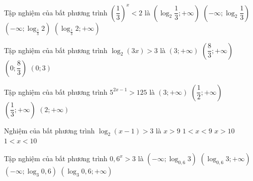 \begin{ex}%
	Tập  nghiệm của bất phương trình $\left(\dfrac{1}{3}\right)^{x} <2$ là
	\choice 
		{$\left(\log_2  \dfrac{1}{3};+\infty\right)$}
		{$\left(-\infty;\log_2 \dfrac{1}{3}\right)$} 
		{$\left(-\infty;\log_{\tfrac{1}{3}}2\right)$} 
		 {\True $\left(\log_{\tfrac{1}{3}}2;+\infty\right)$}
\end{ex}

\begin{ex}%
	Tập nghiệm của bất phương  trình $\log_2(3x) > 3$ là
	\choice 
		{$(3;+\infty)$} 
		 {\True $\left(\dfrac{8}{3};+\infty\right)$}
		{$\left(0; \dfrac{8}{3}\right)$} 
		{$(0;3)$} 
\end{ex}

\begin{ex}%
	Tập  nghiệm của bất phương trình $5^{2x-1}>125$ là
	\choice 
		 { $\left(3;+\infty\right)$}
		 {$\left(\dfrac{1}{2};+\infty\right)$}
		{$\left(\dfrac{1}{3};+\infty\right)$} 
		{\True  $\left(2;+\infty\right)$}
\end{ex}

\begin{ex}%
	Nghiệm của bất phương trình $\log_2  \left(x-1\right)>3$ là
	 \choice
		{\True $x>9$} 
		{$1<x<9$} 
		 {$x>10$}
		{$1<x<10$} 
\end{ex}

\begin{ex}%
	Tập nghiệm của bất phương trình  $0{,}6^x>3$ là
	 \choice
		 {\True $\left(-\infty;\log_{0{,}6} 3\right)$}
		{$\left(\log_{0{,}6}  3;+\infty\right)$}
		{$\left(-\infty;\log_{3} 0{,}6\right)$} 
		 {$\left(\log_{3} 0{,}6;+\infty\right)$}
\end{ex}

